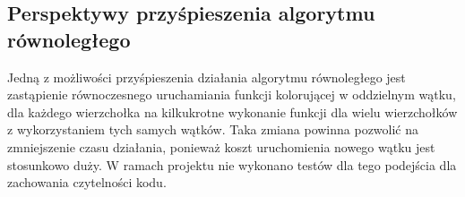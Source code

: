 \documentclass{article}
\begin{document}
	\subsection{Perspektywy przyśpieszenia algorytmu równoległego}
	Jedną z możliwości przyśpieszenia działania algorytmu równoległego jest zastąpienie równoczesnego uruchamiania funkcji kolorującej w oddzielnym wątku, dla każdego wierzchołka na kilkukrotne wykonanie funkcji dla wielu wierzchołków z wykorzystaniem tych samych wątków. Taka zmiana powinna pozwolić na zmniejszenie czasu działania, ponieważ koszt uruchomienia nowego wątku jest stosunkowo duży. W ramach projektu nie wykonano testów dla tego podejścia dla zachowania czytelności kodu.
	
	

 


\end{document}
